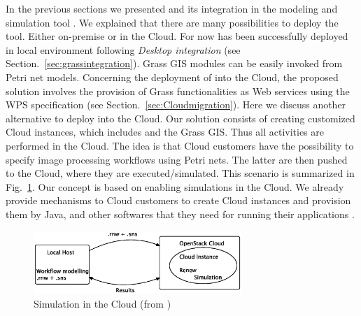 \label{sec:discussion}
%
In the previous sections we presented \RenewGrass{} and its integration in the modeling and simulation tool \Renew{}. 
%
We explained that there are many possibilities to deploy the tool. 
%
Either on-premise or in the Cloud.
%
For now \RenewGrass{} has been successfully deployed in local environment following \emph{Desktop integration} (see Section.~\ref{sec:grassintegration}). 
%
Grass GIS modules can be easily invoked from Petri net models.
%
Concerning the deployment of \RenewGrass{} into the Cloud, the proposed solution involves the provision of Grass functionalities as Web services using the WPS specification (see Section.~\ref{sec:Cloudmigration}). 
%
Here we discuss another alternative to deploy \RenewGrass{} into the Cloud.
%
Our solution consists of creating customized Cloud instances, which includes \Renew{} and the Grass GIS.
%
Thus all activities are performed in the Cloud.
%
The idea is that Cloud customers have the possibility to specify image processing workflows using Petri nets.
%
The latter are then pushed to the Cloud, where they are executed/simulated.
%
This scenario is summarized in Fig.~\ref{fig:renew_cloud}.
%
Our concept is based on enabling \Renew{} simulations in the Cloud.
%
We already provide mechanisms to Cloud customers to create Cloud instances and provision them by Java, \Renew{} and other softwares that they need for running their applications \cite{Bendoukha+15a}.
%

\begin{figure}[!t]
\centering
\includegraphics[width=0.7\textwidth]{images/openstacksimulation}
\caption{\Renew{} Simulation in the Cloud (from \cite{Bendoukha+15a})}
\label{fig:renew_cloud}
\end{figure}
%
 
